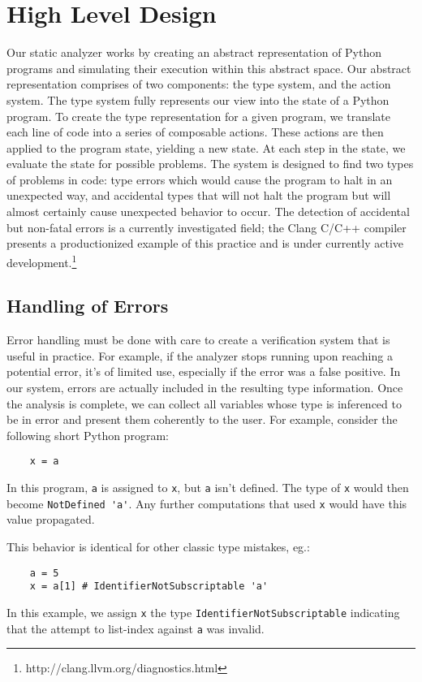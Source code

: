 \documentclass{article}[12pt]
\begin{document}
\section{High Level Design} Our static analyzer works by creating an abstract representation of
Python programs and simulating their execution within this abstract space. Our abstract
representation comprises of two components: the type system, and the action system. The type
system fully represents our view into the state of a Python program. To create the
type representation for a given program, we translate each line of code into a series of composable
actions.  These actions are then applied to the program state, yielding a new state. At each step in
the state, we evaluate the state for possible problems. The system is
designed to find two types of problems in code: type errors which would cause the program to halt in
an unexpected way, and accidental types that will not halt the program but will almost certainly
cause unexpected behavior to occur. The detection of accidental but non-fatal errors is a currently
investigated field; the Clang C/C++ compiler presents a productionized example of this practice and
is under currently active development.\footnote{http://clang.llvm.org/diagnostics.html}

\subsection{Handling of Errors}

Error handling must be done with care to create a verification system that is useful in practice.
For example, if the analyzer stops running upon reaching a potential error, it's of limited use,
especially if the error was a false positive. In our system, errors are actually included in the
resulting type information. Once the analysis is complete, we can collect all variables whose type
is inferenced to be in error and present them coherently to the user. For example, consider the
following short Python program:

\begin{verbatim}
    x = a
\end{verbatim}
In this program, \verb=a= is assigned to \verb=x=, but \verb=a= isn't defined. The type of
\verb=x= would then become \verb=NotDefined 'a'=. Any further computations that used \verb=x= would
have this value propagated.

This behavior is identical for other classic type mistakes, eg.:
\begin{verbatim}
    a = 5
    x = a[1] # IdentifierNotSubscriptable 'a'
\end{verbatim}
In this example, we assign \verb=x= the type \texttt{IdentifierNotSubscriptable} indicating that the attempt to
list-index against \texttt{a} was invalid.
\end{document}
